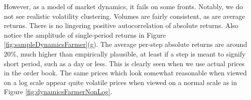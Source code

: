 \documentclass[runningheads]{llncs}
\begin{document}
However, as a model of market dynamics, it fails on some fronts. Notably, we do not see realistic volatility clustering. Volumes are fairly consistent, as are average returns. There is no lingering positive autocorrelation of absolute returns. Also notice the amplitude of single-period returns in Figure \ref{fig:sampleDynamicsFarmer}(g). The average per-step absolute returns are around $20\%$, much higher than empirically plausible, at least if a step is meant to signify short period, such as a day or less. This is clearly seen when we use actual prices in the order book. The same prices which look somewhat reasonable when viewed on a log scale appear quite volatile prices when viewed on a normal scale as in Figure \ref{fig:dynamicsFarmerNonLog}.

\begin{figure}[htbp]
  \begin{center}
   \mbox{
      \quad
}
\end{center}
\end{figure}
\end{document}
